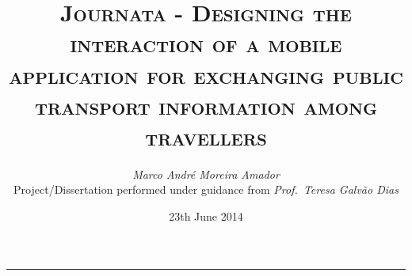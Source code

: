 \documentclass[9pt,a4paper]{extarticle}
\begin{document}
\title{\vspace*{-8mm}\textbf{\textsc{Journata - Designing the interaction of a mobile application for exchanging public transport information among travellers}}}
\author{\emph{Marco André Moreira Amador}\\[2mm]
\small{Project/Dissertation performed under guidance from \emph{Prof.\ Teresa Galvão Dias}}\\
}
\date{23th June 2014}
\maketitle
\thispagestyle{empty}

\vspace*{-4mm}\noindent\rule{\textwidth}{0.4pt}\vspace*{4mm}
\end{document}
